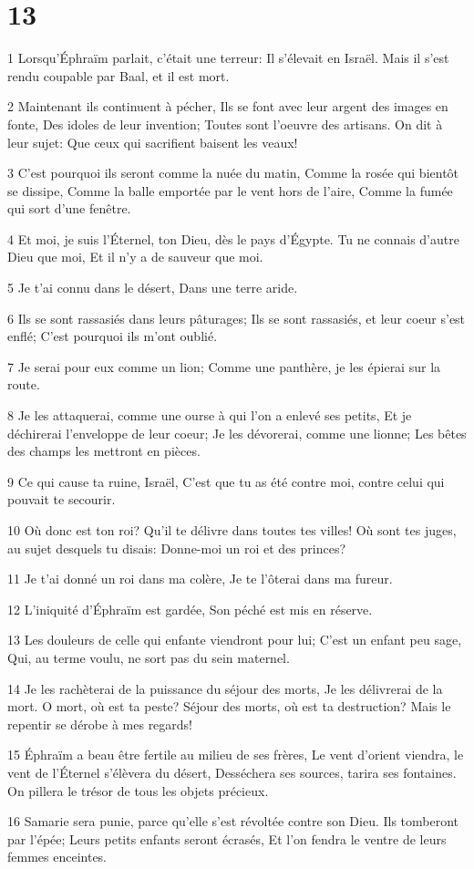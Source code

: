 \chapter{13}

\par 1 Lorsqu'Éphraïm parlait, c'était une terreur: Il s'élevait en Israël. Mais il s'est rendu coupable par Baal, et il est mort.
\par 2 Maintenant ils continuent à pécher, Ils se font avec leur argent des images en fonte, Des idoles de leur invention; Toutes sont l'oeuvre des artisans. On dit à leur sujet: Que ceux qui sacrifient baisent les veaux!
\par 3 C'est pourquoi ils seront comme la nuée du matin, Comme la rosée qui bientôt se dissipe, Comme la balle emportée par le vent hors de l'aire, Comme la fumée qui sort d'une fenêtre.
\par 4 Et moi, je suis l'Éternel, ton Dieu, dès le pays d'Égypte. Tu ne connais d'autre Dieu que moi, Et il n'y a de sauveur que moi.
\par 5 Je t'ai connu dans le désert, Dans une terre aride.
\par 6 Ils se sont rassasiés dans leurs pâturages; Ils se sont rassasiés, et leur coeur s'est enflé; C'est pourquoi ils m'ont oublié.
\par 7 Je serai pour eux comme un lion; Comme une panthère, je les épierai sur la route.
\par 8 Je les attaquerai, comme une ourse à qui l'on a enlevé ses petits, Et je déchirerai l'enveloppe de leur coeur; Je les dévorerai, comme une lionne; Les bêtes des champs les mettront en pièces.
\par 9 Ce qui cause ta ruine, Israël, C'est que tu as été contre moi, contre celui qui pouvait te secourir.
\par 10 Où donc est ton roi? Qu'il te délivre dans toutes tes villes! Où sont tes juges, au sujet desquels tu disais: Donne-moi un roi et des princes?
\par 11 Je t'ai donné un roi dans ma colère, Je te l'ôterai dans ma fureur.
\par 12 L'iniquité d'Éphraïm est gardée, Son péché est mis en réserve.
\par 13 Les douleurs de celle qui enfante viendront pour lui; C'est un enfant peu sage, Qui, au terme voulu, ne sort pas du sein maternel.
\par 14 Je les rachèterai de la puissance du séjour des morts, Je les délivrerai de la mort. O mort, où est ta peste? Séjour des morts, où est ta destruction? Mais le repentir se dérobe à mes regards!
\par 15 Éphraïm a beau être fertile au milieu de ses frères, Le vent d'orient viendra, le vent de l'Éternel s'élèvera du désert, Desséchera ses sources, tarira ses fontaines. On pillera le trésor de tous les objets précieux.
\par 16 Samarie sera punie, parce qu'elle s'est révoltée contre son Dieu. Ils tomberont par l'épée; Leurs petits enfants seront écrasés, Et l'on fendra le ventre de leurs femmes enceintes.

